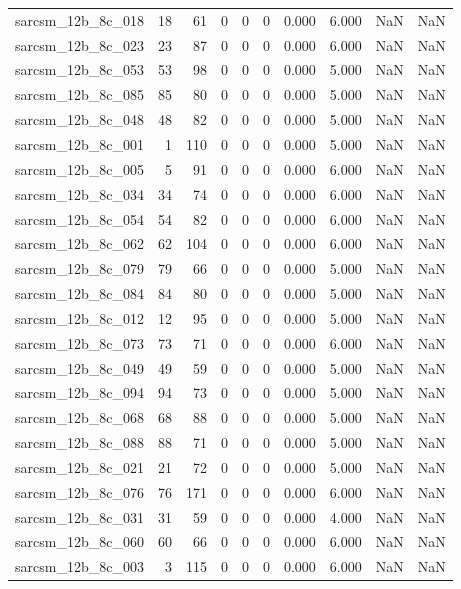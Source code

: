 \documentclass{article}
\begin{document}
\begin{longtable}{lrrrrrrrrr}
sarcsm\_12b\_8c\_018 & 18 & 61 & 0 & 0 & 0 & 0.000 & 6.000 & NaN & NaN \\
sarcsm\_12b\_8c\_023 & 23 & 87 & 0 & 0 & 0 & 0.000 & 6.000 & NaN & NaN \\
sarcsm\_12b\_8c\_053 & 53 & 98 & 0 & 0 & 0 & 0.000 & 5.000 & NaN & NaN \\
sarcsm\_12b\_8c\_085 & 85 & 80 & 0 & 0 & 0 & 0.000 & 5.000 & NaN & NaN \\
sarcsm\_12b\_8c\_048 & 48 & 82 & 0 & 0 & 0 & 0.000 & 5.000 & NaN & NaN \\
sarcsm\_12b\_8c\_001 & 1 & 110 & 0 & 0 & 0 & 0.000 & 5.000 & NaN & NaN \\
sarcsm\_12b\_8c\_005 & 5 & 91 & 0 & 0 & 0 & 0.000 & 6.000 & NaN & NaN \\
sarcsm\_12b\_8c\_034 & 34 & 74 & 0 & 0 & 0 & 0.000 & 6.000 & NaN & NaN \\
sarcsm\_12b\_8c\_054 & 54 & 82 & 0 & 0 & 0 & 0.000 & 6.000 & NaN & NaN \\
sarcsm\_12b\_8c\_062 & 62 & 104 & 0 & 0 & 0 & 0.000 & 6.000 & NaN & NaN \\
sarcsm\_12b\_8c\_079 & 79 & 66 & 0 & 0 & 0 & 0.000 & 5.000 & NaN & NaN \\
sarcsm\_12b\_8c\_084 & 84 & 80 & 0 & 0 & 0 & 0.000 & 5.000 & NaN & NaN \\
sarcsm\_12b\_8c\_012 & 12 & 95 & 0 & 0 & 0 & 0.000 & 5.000 & NaN & NaN \\
sarcsm\_12b\_8c\_073 & 73 & 71 & 0 & 0 & 0 & 0.000 & 6.000 & NaN & NaN \\
sarcsm\_12b\_8c\_049 & 49 & 59 & 0 & 0 & 0 & 0.000 & 5.000 & NaN & NaN \\
sarcsm\_12b\_8c\_094 & 94 & 73 & 0 & 0 & 0 & 0.000 & 5.000 & NaN & NaN \\
sarcsm\_12b\_8c\_068 & 68 & 88 & 0 & 0 & 0 & 0.000 & 5.000 & NaN & NaN \\
sarcsm\_12b\_8c\_088 & 88 & 71 & 0 & 0 & 0 & 0.000 & 5.000 & NaN & NaN \\
sarcsm\_12b\_8c\_021 & 21 & 72 & 0 & 0 & 0 & 0.000 & 5.000 & NaN & NaN \\
sarcsm\_12b\_8c\_076 & 76 & 171 & 0 & 0 & 0 & 0.000 & 6.000 & NaN & NaN \\
sarcsm\_12b\_8c\_031 & 31 & 59 & 0 & 0 & 0 & 0.000 & 4.000 & NaN & NaN \\
sarcsm\_12b\_8c\_060 & 60 & 66 & 0 & 0 & 0 & 0.000 & 6.000 & NaN & NaN \\
sarcsm\_12b\_8c\_003 & 3 & 115 & 0 & 0 & 0 & 0.000 & 6.000 & NaN & NaN \\

\end{longtable}
\end{document}
